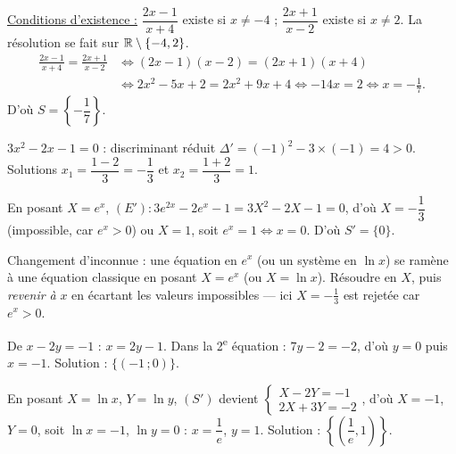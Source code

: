 \documentclass[11pt]{article}
\begin{document}
\begin{questions}
  \item \underline{Conditions d'existence :} $\dfrac{2x-1}{x+4}$ existe si $x \ne -4$ ; $\dfrac{2x+1}{x-2}$ existe si $x \ne 2$. La résolution se fait sur $\mathbb{R}\setminus\{-4, 2\}$.
  \begin{align*}
  \frac{2x-1}{x+4} = \frac{2x+1}{x-2} &\Longleftrightarrow (2x-1)(x-2) = (2x+1)(x+4) \\
  &\Longleftrightarrow 2x^2 - 5x + 2 = 2x^2 + 9x + 4 \Longleftrightarrow -14x = 2 \Longleftrightarrow x = -\frac{1}{7}.
  \end{align*}
  D'où $S = \left\{-\dfrac{1}{7}\right\}$.
  \item \begin{sousq}
    \item $3x^2 - 2x - 1 = 0$ : discriminant réduit $\Delta' = (-1)^2 - 3\times(-1) = 4 > 0$. Solutions $x_1 = \dfrac{1-2}{3} = -\dfrac{1}{3}$ et $x_2 = \dfrac{1+2}{3} = 1$.
    \item En posant $X = e^x$, $(E') : 3e^{2x} - 2e^x - 1 = 3X^2 - 2X - 1 = 0$, d'où $X = -\dfrac{1}{3}$ (impossible, car $e^x > 0$) ou $X = 1$, soit $e^x = 1 \Leftrightarrow x = 0$. D'où $S' = \{0\}$.

\begin{methode}
Changement d'inconnue : une équation en $e^x$ (ou un système en
$\ln x$) se ramène à une équation classique en posant $X = e^x$ (ou
$X = \ln x$). Résoudre en $X$, puis \emph{revenir à} $x$ en écartant
les valeurs impossibles — ici $X = -\frac{1}{3}$ est rejetée car
$e^x > 0$.
\end{methode}
  \end{sousq}
  \item \begin{sousq}
    \item De $x - 2y = -1$ : $x = 2y - 1$. Dans la 2\textsuperscript{e} équation : $7y - 2 = -2$, d'où $y = 0$ puis $x = -1$. Solution : $\{(-1\,;0)\}$.
    \item En posant $X = \ln x$, $Y = \ln y$, $(S')$ devient $\begin{cases} X - 2Y = -1 \\ 2X + 3Y = -2 \end{cases}$, d'où $X = -1$, $Y = 0$, soit $\ln x = -1$, $\ln y = 0$ : $x = \dfrac{1}{e}$, $y = 1$. Solution : $\left\{\left(\dfrac{1}{e}, 1\right)\right\}$.
  \end{sousq}
\end{questions}
\end{document}
